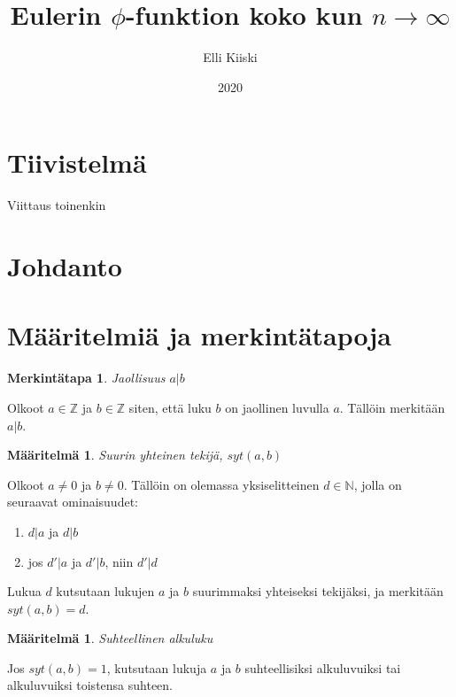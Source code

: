 \documentclass{article}
\title{Eulerin $\phi$-funktion koko kun $n \rightarrow \infty$}
\author{Elli Kiiski}
\date{2020}
\theoremstyle{definition}
\newtheorem{maaritelma}[subsection]{Määritelmä}
\newtheorem{merkinta}[subsection]{Merkintätapa}
\begin{document}
\maketitle

\newpage

\section{Tiivistelmä}

Viittaus \cite{HardyWright} toinenkin \cite{Saksman}

\section{Johdanto}

\section{Määritelmiä ja merkintätapoja}

\begin{merkinta}{\emph{Jaollisuus $a \vert b$}}

Olkoot $a \in \mathbb{Z}$ ja $b \in \mathbb{Z}$ siten, että luku $b$ on jaollinen luvulla $a$. Tällöin merkitään $a \vert b$.

\end{merkinta}

\begin{maaritelma}{\emph{Suurin yhteinen tekijä, $syt(a, b)$}}

Olkoot $a \not= 0$ ja $b \not= 0$. Tällöin on olemassa yksiselitteinen $d \in \mathbb{N}$, jolla on seuraavat ominaisuudet:

\begin{enumerate}
 \item $d \vert a$ ja $d \vert b$
 \item jos $d' \vert a$ ja $d' \vert b$, niin $d' \vert d$
\end{enumerate}

Lukua $d$ kutsutaan lukujen $a$ ja $b$ suurimmaksi yhteiseksi tekijäksi, ja merkitään $syt(a,b) = d$.

\end{maaritelma}

\begin{maaritelma}{\emph{Suhteellinen alkuluku}}

Jos $syt(a,b) = 1$, kutsutaan lukuja $a$ ja $b$ suhteellisiksi alkuluvuiksi tai alkuluvuiksi toistensa suhteen.

\end{maaritelma}
\end{document}
